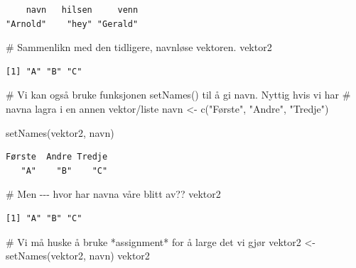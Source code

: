 \documentclass[
  letterpaper,
  DIV=11,
  numbers=noendperiod]{scrartcl}
\newenvironment{Shaded}{\begin{snugshade}}{\end{snugshade}}
\newcommand{\CommentTok}[1]{\textcolor[rgb]{0.37,0.37,0.37}{#1}}
\newcommand{\FunctionTok}[1]{\textcolor[rgb]{0.28,0.35,0.67}{#1}}
\newcommand{\NormalTok}[1]{\textcolor[rgb]{0.00,0.23,0.31}{#1}}
\newcommand{\OtherTok}[1]{\textcolor[rgb]{0.00,0.23,0.31}{#1}}
\newcommand{\StringTok}[1]{\textcolor[rgb]{0.13,0.47,0.30}{#1}}
\begin{document}
\begin{verbatim}
    navn   hilsen     venn 
"Arnold"    "hey" "Gerald" 
\end{verbatim}

\begin{Shaded}
\begin{Highlighting}[]
\CommentTok{\# Sammenlikn med den tidligere, navnløse vektoren. }
\NormalTok{vektor2}
\end{Highlighting}
\end{Shaded}

\begin{verbatim}
[1] "A" "B" "C"
\end{verbatim}

\begin{Shaded}
\begin{Highlighting}[]
\CommentTok{\# Vi kan også bruke funksjonen \textasciigrave{}setNames()\textasciigrave{} til å gi navn. Nyttig hvis vi har}
\CommentTok{\# navna lagra i en annen vektor/liste}
\NormalTok{navn }\OtherTok{\textless{}{-}} \FunctionTok{c}\NormalTok{(}\StringTok{"Første"}\NormalTok{, }\StringTok{"Andre"}\NormalTok{, }\StringTok{"Tredje"}\NormalTok{)}

\FunctionTok{setNames}\NormalTok{(vektor2, navn)}
\end{Highlighting}
\end{Shaded}

\begin{verbatim}
Første  Andre Tredje 
   "A"    "B"    "C" 
\end{verbatim}

\begin{Shaded}
\begin{Highlighting}[]
\CommentTok{\# Men {-}{-}{-} hvor har navna våre blitt av??}
\NormalTok{vektor2}
\end{Highlighting}
\end{Shaded}

\begin{verbatim}
[1] "A" "B" "C"
\end{verbatim}

\begin{Shaded}
\begin{Highlighting}[]
\CommentTok{\# Vi må huske å bruke *assignment* for å large det vi gjør}
\NormalTok{vektor2 }\OtherTok{\textless{}{-}} \FunctionTok{setNames}\NormalTok{(vektor2, navn)}
\NormalTok{vektor2}
\end{Highlighting}
\end{Shaded}
\end{document}
